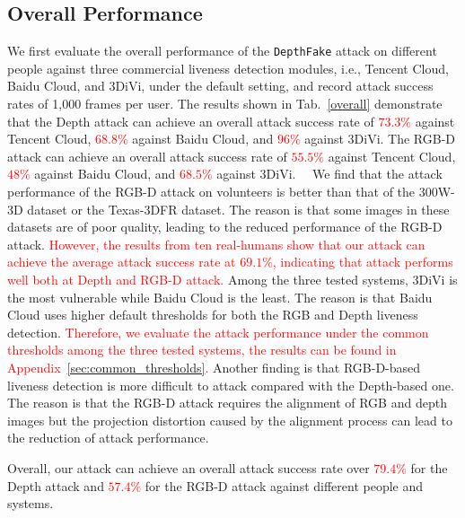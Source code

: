 \subsection{Overall Performance}
\label{sec::overall}
We first evaluate the overall performance of the \texttt{DepthFake}  attack on different people against three commercial liveness detection modules, i.e., Tencent Cloud, Baidu Cloud, and 3DiVi, under the default setting, and record attack success rates of 1,000 frames per user. 
The results shown in Tab.~\ref{overall} demonstrate that the Depth attack can achieve an overall attack success rate of  \textcolor{red}{$73.3\%$} against Tencent Cloud,  \textcolor{red}{$68.8\%$} against Baidu Cloud, and  \textcolor{red}{$96\%$} against 3DiVi. The RGB-D attack can achieve an overall attack success rate of  \textcolor{red}{$55.5\%$} against Tencent Cloud,  \textcolor{red}{$48\%$} against Baidu Cloud, and  \textcolor{red}{$68.5\%$} against 3DiVi.  
We find that the attack performance of the RGB-D attack on volunteers is better than that of the 300W-3D dataset or the Texas-3DFR dataset. The reason is that some images in these  datasets are of poor quality, leading to the reduced performance of the RGB-D attack.
\textcolor{red}{However, the results from ten real-humans show that our attack can achieve the average attack success rate at $69.1\%$, indicating that \alias attack performs well both at Depth and RGB-D attack.}
Among the three tested systems, 3DiVi is the most vulnerable while Baidu Cloud is the least. The reason is that Baidu Cloud uses higher default thresholds for both the RGB and Depth liveness detection. 
\textcolor{red}{Therefore, we evaluate the attack performance under the common thresholds among the three tested systems, the results can be found in Appendix~\ref{sec:common_thresholds}.}
Another finding is that RGB-D-based liveness detection is more difficult to attack compared with the Depth-based one. The reason is that the RGB-D attack requires the alignment of RGB and depth images but the projection distortion caused by the alignment process can lead to the reduction of attack performance.

Overall, our attack can achieve an overall attack success rate over  \textcolor{red}{$79.4\%$} for the Depth attack and  \textcolor{red}{$57.4\%$} for the RGB-D attack against different people and systems.



